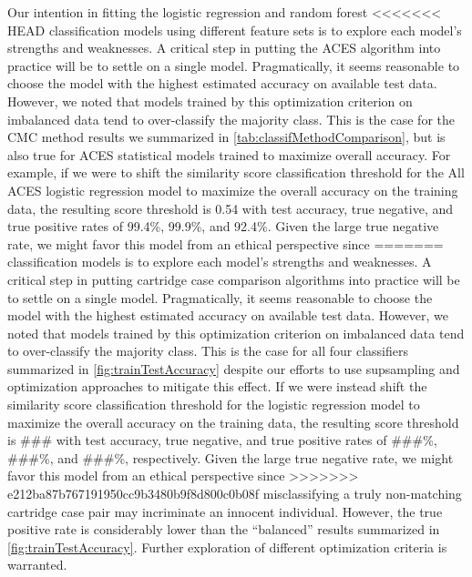 \documentclass[reprint]{JASA}
\begin{document}
Our intention in fitting the logistic regression and random forest
<<<<<<< HEAD
classification models using different feature sets is to explore each
model's strengths and weaknesses. A critical step in putting the ACES
algorithm into practice will be to settle on a single model.
Pragmatically, it seems reasonable to choose the model with the highest
estimated accuracy on available test data. However, we noted that models
trained by this optimization criterion on imbalanced data tend to
over-classify the majority class. This is the case for the CMC method
results we summarized in \autoref{tab:classifMethodComparison}, but is
also true for ACES statistical models trained to maximize overall
accuracy. For example, if we were to shift the similarity score
classification threshold for the All ACES logistic regression model to
maximize the overall accuracy on the training data, the resulting score
threshold is 0.54 with test accuracy, true negative, and true positive
rates of 99.4\%, 99.9\%, and 92.4\%. Given the large true negative rate,
we might favor this model from an ethical perspective since
=======
classification models is to explore each model's strengths and
weaknesses. A critical step in putting cartridge case comparison
algorithms into practice will be to settle on a single model.
Pragmatically, it seems reasonable to choose the model with the highest
estimated accuracy on available test data. However, we noted that models
trained by this optimization criterion on imbalanced data tend to
over-classify the majority class. This is the case for all four
classifiers summarized in \autoref{fig:trainTestAccuracy} despite our
efforts to use supsampling and optimization approaches to mitigate this
effect. If we were instead shift the similarity score classification
threshold for the logistic regression model to maximize the overall
accuracy on the training data, the resulting score threshold is \#\#\#
with test accuracy, true negative, and true positive rates of \#\#\#\%,
\#\#\#\%, and \#\#\#\%, respectively. Given the large true negative
rate, we might favor this model from an ethical perspective since
>>>>>>> e212ba87b767191950cc9b3480b9f8d800c0b08f
misclassifying a truly non-matching cartridge case pair may incriminate
an innocent individual. However, the true positive rate is considerably
lower than the ``balanced'' results summarized in
\autoref{fig:trainTestAccuracy}. Further exploration of different
optimization criteria is warranted.
\end{document}
